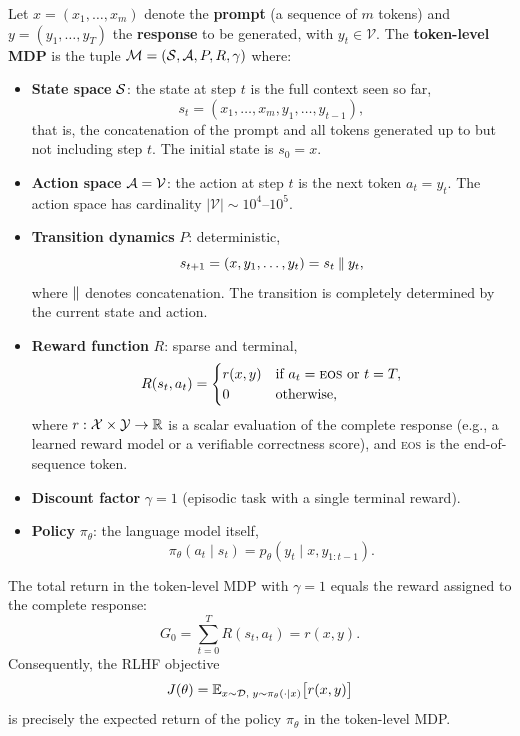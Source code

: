 \begin{definition}
\label{def:token-mdp}
Let $x = (x_1, \ldots, x_m)$ denote the \textbf{prompt} (a sequence of $m$ tokens) and $y = (y_1, \ldots, y_T)$ the \textbf{response} to be generated, with $y_t \in \mathcal{V}$. The \textbf{token-level MDP} is the tuple $\mathcal{M} = (\mathcal{S}, \mathcal{A}, P, R, \gamma)$ where:
\begin{itemize}[leftmargin=*]
  \item \textbf{State space} $\mathcal{S}$: the state at step $t$ is the full context seen so far,
  \[
  s_t = (x_1, \ldots, x_m, y_1, \ldots, y_{t-1}),
  \]
  that is, the concatenation of the prompt and all tokens generated up to but not including step $t$. The initial state is $s_0 = x$.
  \item \textbf{Action space} $\mathcal{A} = \mathcal{V}$: the action at step $t$ is the next token $a_t = y_t$. The action space has cardinality $|\mathcal{V}| \sim 10^4$--$10^5$.
  \item \textbf{Transition dynamics} $P$: deterministic,
  \[
  s_{t+1} = (x, y_1, \ldots, y_t) = s_t \mathbin{\|} y_t,
  \]
  where $\mathbin{\|}$ denotes concatenation. The transition is completely determined by the current state and action.
  \item \textbf{Reward function} $R$: sparse and terminal,
  \[
  R(s_t, a_t) = \begin{cases} r(x, y) & \text{if } a_t = \textsc{eos} \text{ or } t = T, \\ 0 & \text{otherwise,} \end{cases}
  \]
  where $r : \mathcal{X} \times \mathcal{Y} \to \mathbb{R}$ is a scalar evaluation of the complete response (e.g., a learned reward model or a verifiable correctness score), and \textsc{eos} is the end-of-sequence token.
  \item \textbf{Discount factor} $\gamma = 1$ (episodic task with a single terminal reward).
  \item \textbf{Policy} $\pi_\theta$: the language model itself,
  \[
  \pi_\theta(a_t \mid s_t) = p_\theta(y_t \mid x, y_{1:t-1}).
  \]
\end{itemize}
\end{definition}

\begin{proposition}
\label{prop:lm-return}
The total return in the token-level MDP with $\gamma = 1$ equals the reward assigned to the complete response:
\begin{equation}
\label{eq:lm-return}
G_0 = \sum_{t=0}^{T} R(s_t, a_t) = r(x, y).
\end{equation}
Consequently, the RLHF objective
\begin{equation}
\label{eq:rlhf-objective}
J(\theta) = \operatorname{\mathbb{E}}_{x \sim \mathcal{D},\; y \sim \pi_\theta(\cdot \mid x)}\bigl[r(x, y)\bigr]
\end{equation}
is precisely the expected return of the policy $\pi_\theta$ in the token-level MDP.
\end{proposition}

